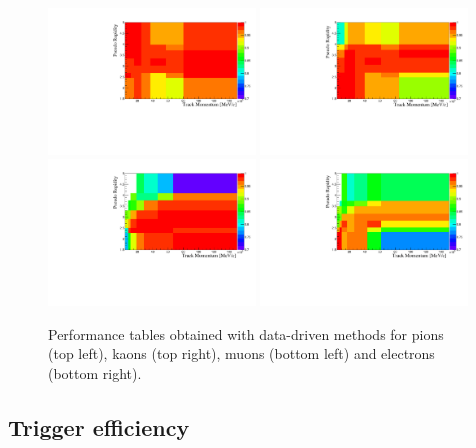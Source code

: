 \begin{figure}[h!]
\centering
\includegraphics[width=0.49\textwidth]{RKst/figs/pid_Pi.pdf}
\includegraphics[width=0.49\textwidth]{RKst/figs/pid_K.pdf}
\includegraphics[width=0.49\textwidth]{RKst/figs/pid_Mu.pdf}
\includegraphics[width=0.49\textwidth]{RKst/figs/pid_e.pdf}
\caption{Performance tables obtained with data-driven methods
for pions (top left), kaons (top right), muons (bottom left) and electrons (bottom right).}
\label{fig:pid_perf_hist}
\end{figure}


\subsection{Trigger efficiency}
\label{sec:RKst_trigger_eff}

